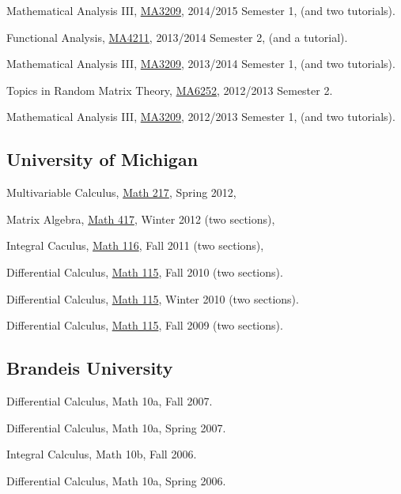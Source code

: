 \documentclass[12pt,a4paper]{article}
\newenvironment{item_list}{
 \begin{list}{}{
   \setlength{\leftmargin}{1.5em}
   \setlength{\itemsep}{0.25em}
   \setlength{\parskip}{0pt}
   \setlength{\parsep}{0.25em}
 }
}{
 \end{list}
}
\begin{document}
\begin{item_list}
\item
  Mathematical Analysis III, \href{https://wangd-math.github.io/teaching/MA3209_F14/index.html}{MA3209}, 2014/2015 Semester 1, (and two tutorials).
\item
  Functional Analysis, \href{https://wangd-math.github.io/teaching/MA4211_S14/index.html}{MA4211}, 2013/2014 Semester 2, (and a tutorial).
\item
  Mathematical Analysis III, \href{https://wangd-math.github.io/teaching/MA3209_F13/index.html}{MA3209}, 2013/2014 Semester 1, (and two tutorials).
\item
  Topics in Random Matrix Theory, \href{https://wangd-math.github.io/teaching/MA6252_S13/index.html}{MA6252}, 2012/2013 Semester 2.
\item
  Mathematical Analysis III, \href{https://wangd-math.github.io/teaching/MA3209_F12/index.html}{MA3209}, 2012/2013 Semester 1, (and two tutorials).
\end{item_list}

\subsection*{University of Michigan}

\begin{item_list}
\item Multivariable Calculus, \href{http://instruct.math.lsa.umich.edu/}{Math 217}, Spring 2012,
\item Matrix Algebra, \href{http://www.math.lsa.umich.edu/courses/undergrad.html#417}{Math 417}, Winter 2012 (two sections),
\item Integral Caculus, \href{http://www.math.lsa.umich.edu/courses/116/}{Math 116}, Fall 2011 (two sections),
\item Differential Calculus, \href{http://www.math.lsa.umich.edu/courses/115/}{Math 115}, Fall 2010 (two sections). 
\item Differential Calculus, \href{http://www.math.lsa.umich.edu/courses/115/}{Math 115}, Winter 2010 (two sections). 
\item Differential Calculus, \href{http://www.math.lsa.umich.edu/courses/115/}{Math 115}, Fall 2009 (two sections).
\end{item_list}

\subsection*{Brandeis University}

\begin{item_list}
\item Differential Calculus, Math 10a,
  Fall 2007. 
\item Differential Calculus, Math 10a,
  Spring 2007. 
\item Integral Calculus, Math 10b,
  Fall 2006.
\item Differential Calculus, Math 10a,
  Spring 2006.
\end{item_list}
\end{document}
